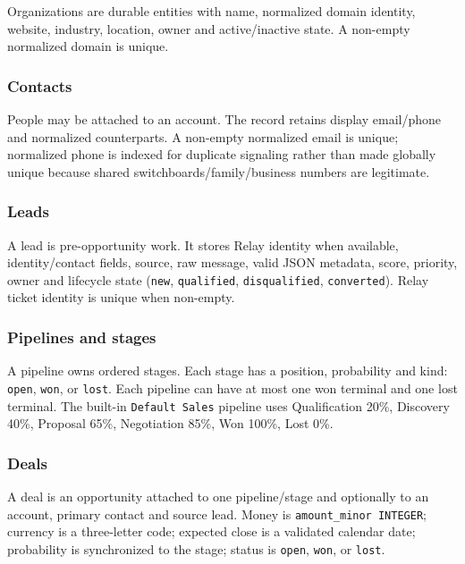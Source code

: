 \documentclass[
]{article}
\begin{document}
Organizations are durable entities with name, normalized domain
identity, website, industry, location, owner and active/inactive state.
A non-empty normalized domain is unique.

\subsubsection{Contacts}\label{contacts}

People may be attached to an account. The record retains display
email/phone and normalized counterparts. A non-empty normalized email is
unique; normalized phone is indexed for duplicate signaling rather than
made globally unique because shared switchboards/family/business numbers
are legitimate.

\subsubsection{Leads}\label{leads}

A lead is pre-opportunity work. It stores Relay identity when available,
identity/contact fields, source, raw message, valid JSON metadata,
score, priority, owner and lifecycle state (\texttt{new},
\texttt{qualified}, \texttt{disqualified}, \texttt{converted}). Relay
ticket identity is unique when non-empty.

\subsubsection{Pipelines and stages}\label{pipelines-and-stages}

A pipeline owns ordered stages. Each stage has a position, probability
and kind: \texttt{open}, \texttt{won}, or \texttt{lost}. Each pipeline
can have at most one won terminal and one lost terminal. The built-in
\texttt{Default\ Sales} pipeline uses Qualification 20\%, Discovery
40\%, Proposal 65\%, Negotiation 85\%, Won 100\%, Lost 0\%.

\subsubsection{Deals}\label{deals}

A deal is an opportunity attached to one pipeline/stage and optionally
to an account, primary contact and source lead. Money is
\texttt{amount\_minor\ INTEGER}; currency is a three-letter code;
expected close is a validated calendar date; probability is synchronized
to the stage; status is \texttt{open}, \texttt{won}, or \texttt{lost}.
\end{document}
